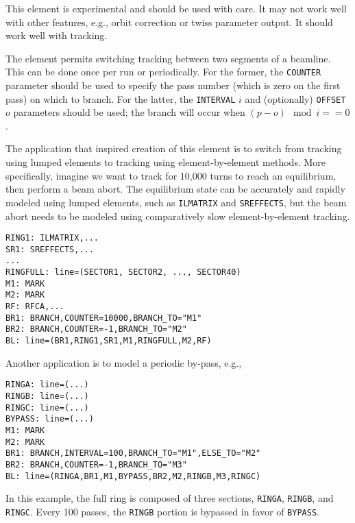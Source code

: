 This element is experimental and should be used with care.
It may not work well with other features, e.g., orbit correction or twiss parameter output.
It should work well with tracking.

The element permits switching tracking between two segments of a beamline. This can be done once per run
or periodically. For the former, the \verb|COUNTER| parameter should be used to specify the pass number (which
is zero on the first pass) on which to branch.
For the latter, the \verb|INTERVAL| $i$ and (optionally) \verb|OFFSET| $o$ parameters should be used; the branch will occur
when $(p-o) \mod i == 0$.

The application that inspired creation of this element is to switch from tracking using lumped elements to tracking
using element-by-element methods.
More specifically, imagine we want to track for 10,000 turns to reach an equilibrium, then perform a beam abort.
The equilibrium state can be accurately and rapidly modeled using lumped elements, such as \verb|ILMATRIX| and \verb|SREFFECTS|,
but the beam abort needs to be modeled using comparatively slow element-by-element tracking.
\begin{verbatim}
RING1: ILMATRIX,...
SR1: SREFFECTS,...
...
RINGFULL: line=(SECTOR1, SECTOR2, ..., SECTOR40)
M1: MARK
M2: MARK
RF: RFCA,...
BR1: BRANCH,COUNTER=10000,BRANCH_TO="M1"
BR2: BRANCH,COUNTER=-1,BRANCH_TO="M2"
BL: line=(BR1,RING1,SR1,M1,RINGFULL,M2,RF)
\end{verbatim}

Another application is to model a periodic by-pass, e.g.,
\begin{verbatim}
RINGA: line=(...)
RINGB: line=(...)
RINGC: line=(...)
BYPASS: line=(...)
M1: MARK
M2: MARK
BR1: BRANCH,INTERVAL=100,BRANCH_TO="M1",ELSE_TO="M2"
BR2: BRANCH,COUNTER=-1,BRANCH_TO="M3"
BL: line=(RINGA,BR1,M1,BYPASS,BR2,M2,RINGB,M3,RINGC)
\end{verbatim}
In this example, the full ring is composed of three sections, \verb|RINGA|, \verb|RINGB|, and \verb|RINGC|.
Every 100 passes, the \verb|RINGB| portion is bypassed in favor of \verb|BYPASS|.

